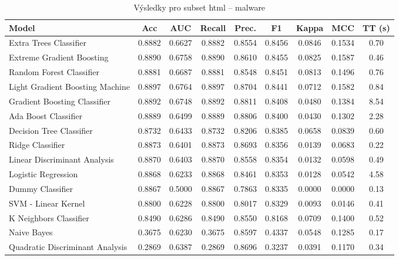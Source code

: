 \begin{table}[H]
  \centering
  \small
  \caption{Výsledky pro subset html – malware}
  \begin{tabular}{|l|c|c|c|c|c|c|c|c|}
    \hline
    \textbf{Model} & \textbf{Acc} & \textbf{AUC} & \textbf{Recall} & \textbf{Prec.} & \textbf{F1} & \textbf{Kappa} & \textbf{MCC} & \textbf{TT (s)} \\
    \hline
    Extra Trees Classifier & 0.8882 & 0.6627 & 0.8882 & 0.8554 & 0.8456 & 0.0846 & 0.1534 & 0.70 \\
    Extreme Gradient Boosting & 0.8890 & 0.6758 & 0.8890 & 0.8610 & 0.8455 & 0.0825 & 0.1587 & 0.46 \\
    Random Forest Classifier & 0.8881 & 0.6687 & 0.8881 & 0.8548 & 0.8451 & 0.0813 & 0.1496 & 0.76 \\
    Light Gradient Boosting Machine & 0.8897 & 0.6764 & 0.8897 & 0.8704 & 0.8441 & 0.0712 & 0.1582 & 0.84 \\
    Gradient Boosting Classifier & 0.8892 & 0.6748 & 0.8892 & 0.8811 & 0.8408 & 0.0480 & 0.1384 & 8.54 \\
    Ada Boost Classifier & 0.8889 & 0.6499 & 0.8889 & 0.8806 & 0.8400 & 0.0430 & 0.1302 & 2.28 \\
    Decision Tree Classifier & 0.8732 & 0.6433 & 0.8732 & 0.8206 & 0.8385 & 0.0658 & 0.0839 & 0.60 \\
    Ridge Classifier & 0.8873 & 0.6401 & 0.8873 & 0.8693 & 0.8356 & 0.0139 & 0.0683 & 0.22 \\
    Linear Discriminant Analysis & 0.8870 & 0.6403 & 0.8870 & 0.8558 & 0.8354 & 0.0132 & 0.0598 & 0.49 \\
    Logistic Regression & 0.8868 & 0.6233 & 0.8868 & 0.8461 & 0.8353 & 0.0128 & 0.0542 & 4.58 \\
    Dummy Classifier & 0.8867 & 0.5000 & 0.8867 & 0.7863 & 0.8335 & 0.0000 & 0.0000 & 0.13 \\
    SVM - Linear Kernel & 0.8800 & 0.6228 & 0.8800 & 0.8017 & 0.8329 & 0.0093 & 0.0146 & 0.41 \\
    K Neighbors Classifier & 0.8490 & 0.6286 & 0.8490 & 0.8550 & 0.8168 & 0.0709 & 0.1400 & 0.52 \\
    Naive Bayes & 0.3675 & 0.6230 & 0.3675 & 0.8597 & 0.4337 & 0.0548 & 0.1285 & 0.17 \\
    Quadratic Discriminant Analysis & 0.2869 & 0.6387 & 0.2869 & 0.8696 & 0.3237 & 0.0391 & 0.1170 & 0.34 \\
    \hline
  \end{tabular}
\end{table}
\vspace{0.5cm}

